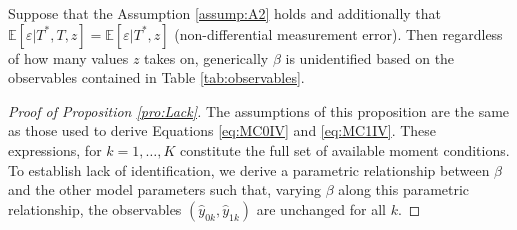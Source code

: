 \begin{pro}
  \label{pro:Lack}
  Suppose that the Assumption \ref{assump:A2} holds and additionally that $\mathbb{E}[\varepsilon|T^*,T,z]=\mathbb{E}[\varepsilon|T^*,z]$ (non-differential measurement error).  
  Then regardless of how many values $z$ takes on, generically $\beta$ is unidentified based on the observables contained in Table \ref{tab:observables}.
\end{pro}
\begin{proof}[Proof of Proposition \ref{pro:Lack}]
  The assumptions of this proposition are the same as those used to derive Equations \ref{eq:MC0IV} and \ref{eq:MC1IV}. 
  These expressions, for $k = 1, \dots, K$ constitute the full set of available moment conditions.
  To establish lack of identification, we derive a parametric relationship between $\beta$ and the other model parameters such that, varying $\beta$ along this parametric relationship, the observables $(\hat{y}_{0k},\hat{y}_{1k})$ are unchanged for all $k$.   


\end{proof}

